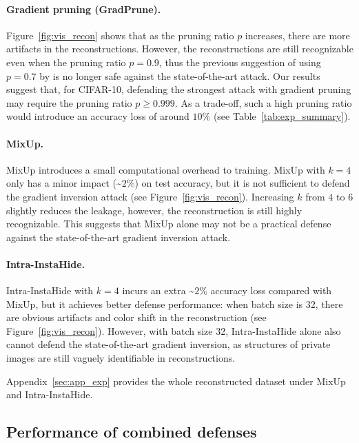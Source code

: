 \paragraph{Gradient pruning (GradPrune).}
Figure~\ref{fig:vis_recon} shows that as the pruning ratio $p$ increases, there are more artifacts in the reconstructions. However, the reconstructions are still recognizable even when the pruning ratio $p=0.9$, thus the previous suggestion of using $p=0.7$ by \citep{zhu2020deep} is no longer safe against the state-of-the-art attack. Our results suggest that, for CIFAR-10, defending the strongest attack with gradient pruning may require the pruning ratio $p\geq 0.999$. As a trade-off, such a high pruning ratio would introduce an accuracy loss of around $10\%$ (see Table~\ref{tab:exp_summary}).  


\paragraph{MixUp.} MixUp introduces a small computational overhead to training. MixUp with $k=4$ only has a minor impact (\textasciitilde$2\%$) on test accuracy, but it is not sufficient to defend the gradient inversion attack (see Figure~\ref{fig:vis_recon}). Increasing $k$ from $4$ to $6$ slightly reduces the leakage, however, the reconstruction is still highly recognizable.  This suggests that MixUp alone may not be a practical defense against the state-of-the-art gradient inversion attack. 


\paragraph{Intra-InstaHide.} Intra-InstaHide with $k=4$ incurs an extra \textasciitilde$2\%$ accuracy loss compared with MixUp, but it achieves better defense performance: when batch size is 32, there are obvious artifacts and color shift in the reconstruction (see Figure~\ref{fig:vis_recon}). However, with batch size 32,  Intra-InstaHide alone also cannot defend the state-of-the-art gradient inversion, as structures of private images are still vaguely identifiable in reconstructions.

Appendix~\ref{sec:app_exp} provides the whole reconstructed dataset under MixUp and Intra-InstaHide.


\subsection{Performance of combined defenses} 
\label{sec:exp_combine}


